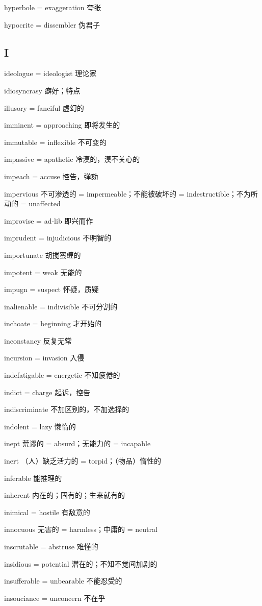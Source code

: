 \documentclass[UTF8, fontset = none, zihao = -4, linespread = 1.1]{ctexart}
\begin{document}
\begin{multicols}{2}
hyperbole = exaggeration 夸张

hypocrite = dissembler 伪君子

\subsection*{I}
ideologue = ideologist 理论家

idiosyncrasy 癖好；特点

illusory = fanciful 虚幻的

imminent = approaching 即将发生的

immutable = inflexible 不可变的

impassive = apathetic 冷漠的，漠不关心的

impeach = accuse 控告，弹劾

impervious 不可渗透的 = impermeable；不能被破坏的 = indestructible；不为所动的 = unaffected

improvise = ad-lib 即兴而作

imprudent = injudicious 不明智的

importunate 胡搅蛮缠的

impotent = weak 无能的

impugn = suspect 怀疑，质疑

inalienable = indivisible 不可分割的

inchoate = beginning 才开始的

inconstancy 反复无常

incursion = invasion 入侵

indefatigable = energetic 不知疲倦的

indict = charge 起诉，控告

indiscriminate 不加区别的，不加选择的

indolent = lazy 懒惰的

inept 荒谬的 = absurd；无能力的 = incapable

inert （人）缺乏活力的 = torpid；（物品）惰性的 

inferable 能推理的

inherent 内在的；固有的；生来就有的

inimical = hostile 有敌意的

innocuous 无害的 = harmless；中庸的 = neutral

inscrutable = abstruse 难懂的

insidious = potential 潜在的；不知不觉间加剧的

insufferable = unbearable 不能忍受的

insouciance = unconcern 不在乎


\end{multicols}
\end{document}
